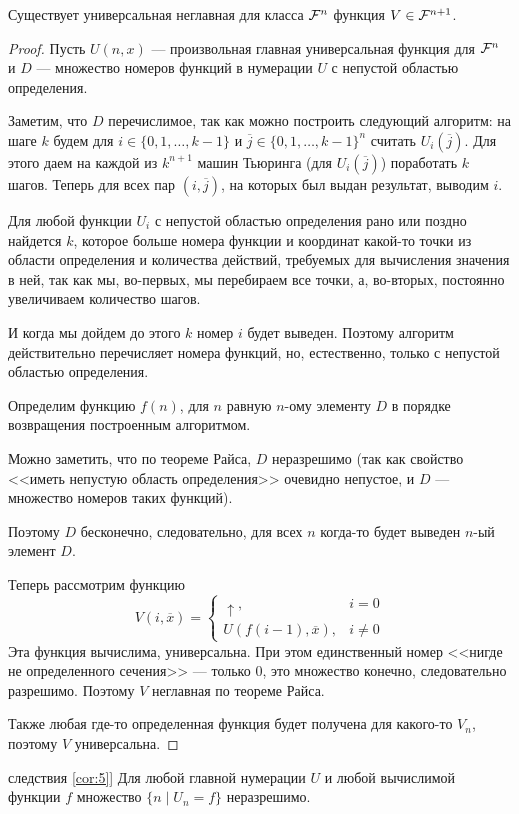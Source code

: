 \begin{cor}\label{cor:5}
	Существует универсальная неглавная для класса $ \mathcal{F}^{n}$ функция $ V \in \mathcal{F}^{n+1}$.
\end{cor}
\begin{proof}
	Пусть $ U(n, x)$ --- произвольная главная универсальная функция для $ \mathcal{F}^{n}$ и $ D$ --- множество номеров функций в нумерации $ U$ с непустой областью определения. 

	\vspace{1em}
	Заметим, что $ D$ перечислимое, так как можно построить следующий алгоритм: 
	на шаге $ k$ будем для $ i \in \{0, 1, \ldots , k-1\}$ и $ \overline{j} \in \{0, 1, \ldots, k-1\}^{n}$
	считать $ U_{i}(\overline{j})$.
	Для этого даем на каждой из $ k^{n+1}$ машин Тьюринга (для $ U_i(\overline{j})$) поработать $ k$ шагов.
	Теперь для всех пар $ (i, \overline{j})$, на которых был выдан результат, выводим $ i$.

	Для любой функции  $ U_i$ с непустой областью определения рано или поздно найдется $ k$, которое больше номера функции и координат какой-то точки из области определения и количества действий, требуемых для вычисления значения в ней, так как мы, во-первых, мы перебираем все точки, а, во-вторых, постоянно увеличиваем количество шагов.

	И когда мы дойдем до этого $ k$ номер $ i$ будет выведен. Поэтому алгоритм действительно перечисляет номера функций, но, естественно, только с непустой областью определения.
	\vspace{1em}

	Определим функцию $ f(n)$, для  $ n$ равную $ n$-ому элементу $ D$ в порядке возвращения построенным алгоритмом. 

	Можно заметить, что по теореме Райса, $ D$ неразрешимо (так как свойство <<иметь непустую область определения>> очевидно непустое, и $ D$ --- множество номеров таких функций).

	Поэтому $ D$ бесконечно, следовательно, для всех $ n$ когда-то будет выведен  $ n $-ый элемент $ D$.

	Теперь рассмотрим функцию
	\[
		V(i, \overline{x}) = \begin{cases}
			\uparrow, & i = 0 \\
			U(f(i-1), \overline{x}), & i \ne 0
		\end{cases}
	\] 
	Эта функция вычислима, универсальна. При этом единственный номер <<нигде не определенного сечения>> --- только $ 0$, это множество конечно, следовательно разрешимо. Поэтому $ V$ неглавная по теореме Райса.

	Также любая где-то определенная функция будет получена для какого-то $ V_n$, поэтому  $ V$ универсальна.
\end{proof}
\begin{cor}[Переформулировка \hyperref[cor:5]{следствия \ref{cor:5}}]
	Для любой главной нумерации $ U$ и любой вычислимой функции $ f$  множество $ \{n \mid U_n = f\}$ неразрешимо.
\end{cor}

